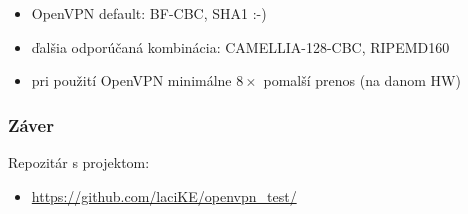 \documentclass{beamer}
\begin{document}
\begin{frame}
	\begin{itemize}
		\item OpenVPN default: BF-CBC, SHA1 :-)
		\item ďalšia odporúčaná kombinácia: CAMELLIA-128-CBC, RIPEMD160
		\item \small pri použití OpenVPN minimálne $8\times$ pomalší prenos (na danom HW)
	\end{itemize}	
\end{frame}

\begin{frame}
	\frametitle{Záver}
	Repozitár s projektom:
	\begin{itemize}
		\item \url{https://github.com/laciKE/openvpn\_test/}
	\end{itemize}
\end{frame}
\end{document}
